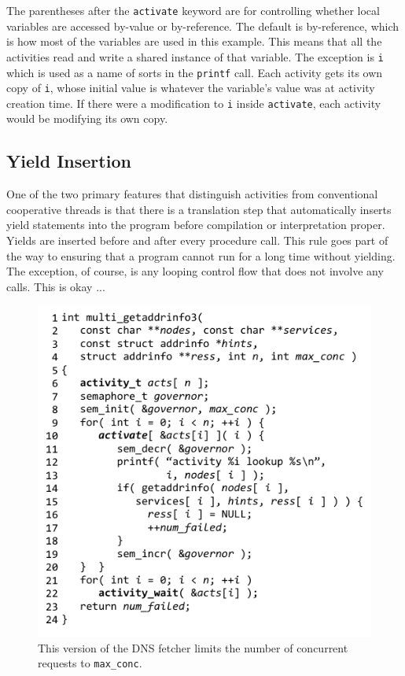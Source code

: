 \documentclass[9pt,preprint]{sigplanconf}
\begin{document}
The parentheses after the \texttt{activate} keyword are for controlling whether local variables are accessed by-value or by-reference.
The default is by-reference, which is how most of the variables are used in this example.
This means that all the activities read and write a shared instance of that variable.
The exception is \texttt{i} which is used as a name of sorts in the \texttt{printf} call.
Each activity gets its own copy of \texttt{i}, whose initial value is whatever the variable's value was at activity creation time.
If there were a modification to \texttt{i} inside \texttt{activate}, each activity would be modifying its own copy.

\subsection{Yield Insertion}

One of the two primary features that distinguish activities from conventional cooperative threads is that there is a translation step that automatically inserts yield statements into the program before compilation or interpretation proper.
Yields are inserted before and after every procedure call.
This rule goes part of the way to ensuring that a program cannot run for a long time without yielding.
The exception, of course, is any looping control flow that does not involve any calls.
This is okay ...

\begin{figure}
\includegraphics{multi_getaddrinfo_sem}
\caption{This version of the DNS fetcher limits the number of concurrent requests to \texttt{max\_conc}.}
\label{fig:charcoal_multidns_sem}
\end{figure}
\end{document}
